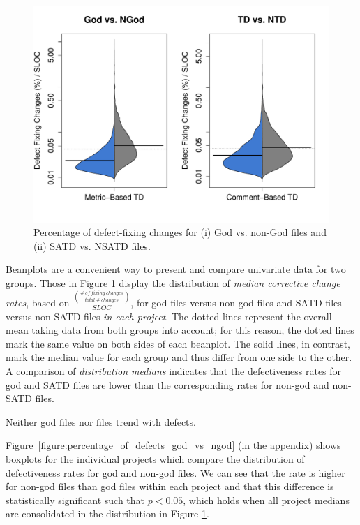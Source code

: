 \begin{figure}[h]
	\centering
	\includegraphics[width=140mm]{figures/chapter4/rq1_defectivness_distrubution_new}
	\caption{Percentage of defect-fixing changes for (i) God vs. non-God files and (ii) SATD vs. NSATD files.}
	\label{figure:ch4_number_of_fixing_changes_TD_vs_NTD}
\end{figure}

Beanplots are a convenient way to present and compare univariate data for two groups. Those in Figure \ref{figure:ch4_number_of_fixing_changes_TD_vs_NTD} display the distribution of \textit{median corrective change rates}, based on $\frac{\left (\frac{\#~of~fixing~changes}{total~\#~changes} \right )}{SLOC}$, for god files versus non-god files and SATD files versus non-SATD files \textit{in each project}. %
The dotted lines represent the overall mean taking data from both groups into account; for this reason, the dotted lines mark the same value on both sides of each beanplot. The solid lines, in contrast, mark the median value for each group and thus differ from one side to the other. A comparison of \textit{distribution medians} indicates that the defectiveness rates for god and SATD files are lower than the corresponding rates for non-god and non-SATD files.

\begin{myboxii}
	Neither god files nor \SATD files trend with defects.
\end{myboxii}

Figure~\ref{figure:percentage_of_defects_god_vs_ngod} (in the appendix) shows boxplots for the individual projects which compare the distribution of defectiveness rates for god and non-god files. We can see that the rate is higher for non-god files than god files within each project and that this difference is statistically significant \revision such that $p < 0.05$, which holds when all project medians are consolidated in the distribution in Figure \ref{figure:ch4_number_of_fixing_changes_TD_vs_NTD}.

